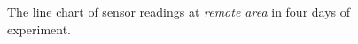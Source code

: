 \begin{figure}[H]
\begin{adjustwidth}{-4.5cm}{}
{{    }
  }
  \end{adjustwidth}
  \caption[The line chart of sensor readings at remote area.]
  {The line chart of sensor readings at \textit{remote area} in four days of experiment.}
  \label{fig:result-remote-line-chart}
\end{figure}


